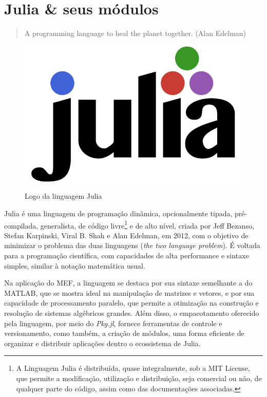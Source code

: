 \chapter{Julia \& seus módulos} 
\label{ch:julia}

\begin{quotation}
    A programming language to heal the planet together.
    (Alan Edelman)
\end{quotation}

\begin{figure}[hbtp]
    \centering
    \caption{Logo da linguagem Julia}
    \includegraphics[scale = 0.6]{Figuras/julia-logo-color.pdf}
    \label{fig:julia-logo}
\end{figure}

Julia é uma linguagem de programação dinâmica, opcionalmente tipada, pré-compilada, generalista, de código livre\footnote{A Linguagem Julia é distribuída, quase integralmente, sob a MIT License, que permite a modificação, utilização e distribuição, seja comercial ou não, de qualquer parte do código, assim como das documentações associadas.} e de alto nível, criada por Jeff Bezanso, Stefan Karpinski, Viral B. Shah e Alan Edelman, em 2012, com o objetivo de minimizar o problema das duas linguagens (\emph{the two language problem}). É voltada para a programação científica, com capacidades de alta performance e sintaxe simples, similar à notação matemática usual. \cite{Sherrington}

Na aplicação do MEF, a linguagem se destaca por sua sintaxe semelhante a do MATLAB, que se mostra ideal na manipulação de matrizes e vetores, e por sua capacidade de processamento paralelo, que permite a otimização na construção e resolução de sistemas algébricos grandes. Além disso, o empacotamento oferecido pela linguagem, por meio do \emph{Pkg.jl}, fornece ferramentas de controle e versionamento, como também, a criação de módulos, uma forma eficiente de organizar e distribuir aplicações dentro o ecossistema de Julia.

